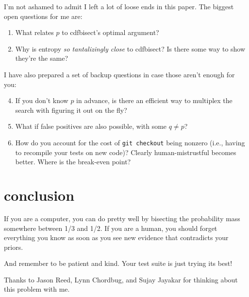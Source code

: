 \documentclass[11pt]{sigplanconf}
\begin{document}
I'm not ashamed to admit I left a lot of loose ends in this paper.
The biggest open questions for me are:
\begin{enumerate}
	\item What relates $p$ to {\sf cdfbisect}'s optimal argument?
	\item Why is {\sf entropy} {\it so tantalizingly close} to {\sf cdfbisect}? Is there some way to show they're the same?
\end{enumerate}
I have also prepared a set of backup questions in case those aren't enough for you:
\begin{enumerate}
	\setcounter{enumi}{3}
	\item If you don't know $p$ in advance, is there an efficient way to multiplex the search with figuring it out on the fly?
	\item What if false positives are also possible, with some $q \ne p$?
	\item How do you account for the cost of {\tt git checkout} being nonzero (i.e., having to recompile your tests on new code)?
		Clearly {\sf human-mistrustful} becomes better. Where is the break-even point?
\end{enumerate}


\section{conclusion}

If you are a computer, you can do pretty well by bisecting the probability mass somewhere between 1/3 and 1/2.
%
If you are a human, you should forget everything you know as soon as you see new evidence that contradicts your priors.

And remember to be patient and kind. Your test suite is just trying its best!

\acks

Thanks to Jason Reed, Lynn Chordbug, and Sujay Jayakar for thinking about this problem with me.


\renewcommand{\refname}{references}


\end{document}
